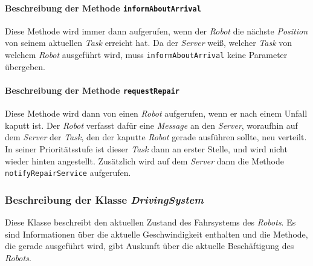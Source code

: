 			\paragraph{Beschreibung der Methode \texttt{informAboutArrival}}
			Diese Methode wird immer dann aufgerufen, wenn der \textit{Robot} die nächste \textit{Position} von seinem aktuellen \textit{Task} erreicht hat.  Da der \textit{Server} weiß, welcher \textit{Task} von welchem \textit{Robot} ausgeführt wird, muss \texttt{informAboutArrival} keine Parameter übergeben.
	
			\paragraph{Beschreibung der Methode \texttt{requestRepair}}
			Diese Methode wird dann von einen \textit{Robot} aufgerufen, wenn er nach einem Unfall kaputt ist. Der \textit{Robot} verfasst dafür eine \textit{Message} an den \textit{Server}, woraufhin auf dem \textit{Server} der \textit{Task}, den der kaputte \textit{Robot} gerade ausführen sollte, neu verteilt. In seiner Prioritätsstufe ist dieser \textit{Task} dann an erster Stelle, und wird nicht wieder hinten angestellt. Zusätzlich wird auf dem \textit{Server} dann die Methode \texttt{notifyRepairService} aufgerufen.		
			
	\subsubsection{Beschreibung der Klasse \textit{DrivingSystem}}
		
		Diese Klasse beschreibt den aktuellen Zustand des Fahrsystems des \textit{Robots}. 
		Es sind Informationen über die aktuelle Geschwindigkeit enthalten und die Methode, 
		die gerade ausgeführt wird, gibt Auskunft über die aktuelle Beschäftigung des \textit{Robots}.

